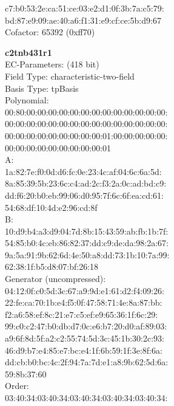     c7:b0:53:2e:ca:51:ce:03:e2:d1:0f:3b:7a:c5:79:\\
    bd:87:e9:09:ae:40:a6:f1:31:e9:cf:ce:5b:d9:67\\
Cofactor:  65392 (0xff70)\\
\item \textbf{ c2tnb431r1 }\\
EC-Parameters: (418 bit)\\
Field Type: characteristic-two-field\\
Basis Type: tpBasis\\
Polynomial:\\
    00:80:00:00:00:00:00:00:00:00:00:00:00:00:00:\\
    00:00:00:00:00:00:00:00:00:00:00:00:00:00:00:\\
    00:00:00:00:00:00:00:00:00:01:00:00:00:00:00:\\
    00:00:00:00:00:00:00:00:00:01\\
A:   \\
    1a:82:7e:f0:0d:d6:fc:0e:23:4c:af:04:6c:6a:5d:\\
    8a:85:39:5b:23:6c:c4:ad:2c:f3:2a:0c:ad:bd:c9:\\
    dd:f6:20:b0:eb:99:06:d0:95:7f:6c:6f:ea:cd:61:\\
    54:68:df:10:4d:e2:96:cd:8f\\
B:   \\
    10:d9:b4:a3:d9:04:7d:8b:15:43:59:ab:fb:1b:7f:\\
    54:85:b0:4c:eb:86:82:37:dd:c9:de:da:98:2a:67:\\
    9a:5a:91:9b:62:6d:4e:50:a8:dd:73:1b:10:7a:99:\\
    62:38:1f:b5:d8:07:bf:26:18\\
Generator (uncompressed):\\
    04:12:0f:c0:5d:3c:67:a9:9d:e1:61:d2:f4:09:26:\\
    22:fe:ca:70:1b:e4:f5:0f:47:58:71:4e:8a:87:bb:\\
    f2:a6:58:ef:8c:21:e7:c5:ef:e9:65:36:1f:6c:29:\\
    99:c0:c2:47:b0:db:d7:0c:e6:b7:20:d0:af:89:03:\\
    a9:6f:8d:5f:a2:c2:55:74:5d:3c:45:1b:30:2c:93:\\
    46:d9:b7:e4:85:e7:bc:e4:1f:6b:59:1f:3e:8f:6a:\\
    dd:cb:b0:bc:4c:2f:94:7a:7d:e1:a8:9b:62:5d:6a:\\
    59:8b:37:60\\
Order: \\
    03:40:34:03:40:34:03:40:34:03:40:34:03:40:34:\\
